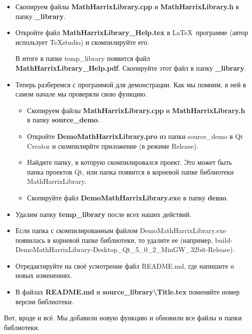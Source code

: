\documentclass[a4paper,12pt]{article}
\begin{document}
\begin{itemize}
\item Скопируем файлы \textbf{MathHarrixLibrary.cpp} и \textbf{MathHarrixLibrary.h} в папку \textbf{\_library}.

\item Откройте файл \textbf{MathHarrixLibrary\_Help.tex } в \LaTeX \ программе (автор использует TeXstudio) и скомпилируйте его.

В итоге в папке temp\_library появится файл \textbf{MathHarrixLibrary\_Help.pdf}. Скопируйте этот файл в папку \textbf{\_library}.

\item Теперь разберемся с программой для демонстрации. Как мы помним, в ней в самом начале мы проверяли свою функцию. 
\begin{itemize}
\item Скопируем файлы \textbf{MathHarrixLibrary.cpp} и \textbf{MathHarrixLibrary.h} в папку \textbf{source\_demo}.
\item  Откройте \textbf{DemoMathHarrixLibrary.pro} из папки source\_demo в Qt Creator и скомпилирйте приложение (в режиме Release).
\item Найдите папку, в которую скомпилировался проект. Это может быть папка проектов Qt, или папка появится в корневой папке библиотеки MathHarrixLibrary.
\item Скопируйте файл \textbf{DemoMathHarrixLibrary.exe} в папку \textbf{demo}.
\end{itemize}
\item Удалим папку \textbf{temp\_library} после всех наших действий.
\item  Если папка с скомпилированным файлом DemoMathHarrixLibrary.exe появилась в корневой папке библиотеки, то удалите ее (например, build-DemoMathHarrixLibrary-Desktop\_Qt\_5\_0\_2\_MinGW\_32bit-Release).
\item Отредактируйте на своё усмотрение файл README.md, где напишите о новых изменениях.
\item В файлах \textbf{README.md} и \textbf{source\_library\textbackslash Title.tex} поменяйте номер версии библиотеки.
\end{itemize}

Вот, вроде и всё. Мы добавили новую функцию и обновили все файлы и папки библиотеки.

\newpage
\end{document}
